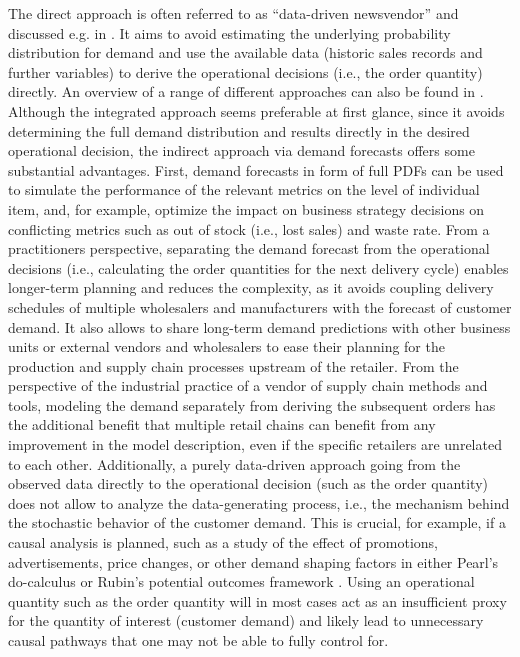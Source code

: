 \documentclass[BCOR=1mm, DIV=calc,10pt,
twoside=true,
twocolumn,
headings=normal]{scrartcl}
\begin{document}
The direct approach is often referred to as ``data-driven newsvendor'' and discussed e.g. in \cite{beutel2012safety,ban2019big,bertsimas2020predictive,oroojlooyjadid2020applying}. It aims to avoid estimating the underlying probability distribution for demand and use the available data (historic sales records and further variables) to derive the operational decisions (i.e., the order quantity) directly. An overview of a range of different approaches can also be found in \cite{huber2019data}. Although the integrated approach seems preferable at first glance, since it avoids determining the full demand distribution and results directly in the desired operational decision, the indirect approach via demand forecasts offers some substantial advantages. First, demand forecasts in form of full PDFs can be used to simulate the performance of the relevant metrics on the level of individual item, and, for example, optimize the impact on business strategy decisions on conflicting metrics such as out of stock (i.e., lost sales) and waste rate. From a practitioners perspective, separating the demand forecast from the operational decisions (i.e., calculating the order quantities for the next delivery cycle) enables longer-term planning and reduces the complexity, as it avoids coupling delivery schedules of multiple wholesalers and manufacturers with the forecast of customer demand. It also allows to share long-term demand predictions with other business units or external vendors and wholesalers to ease their planning for the production and supply chain processes upstream of the retailer. From the perspective of the industrial practice of a vendor of supply chain methods and tools, modeling the demand separately from deriving the subsequent orders has the additional benefit that multiple retail chains can benefit from any improvement in the model description, even if the specific retailers are unrelated to each other. Additionally, a purely data-driven approach going from the observed data directly to the operational decision (such as the order quantity) does not allow to analyze the data-generating process, i.e., the mechanism behind the stochastic behavior of the customer demand. This is crucial, for example, if a causal analysis is planned, such as a study of the effect of promotions, advertisements, price changes, or other demand shaping factors in either Pearl's do-calculus \cite{PearlCausality} or Rubin's potential outcomes framework \cite{rubin1974estimating}. Using an operational quantity such as the order quantity will in most cases act as an insufficient proxy for the quantity of interest (customer demand) and likely lead to unnecessary causal pathways that one may not be able to fully control for.
\end{document}
